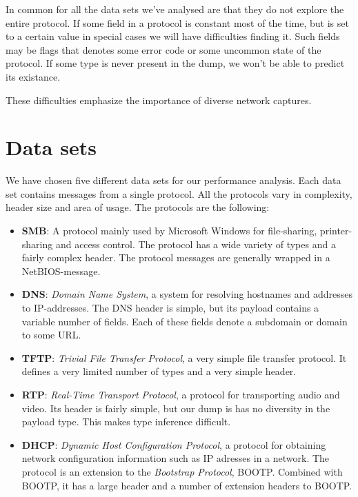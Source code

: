 \documentclass[a4paper]{report}
\begin{document}
In common for all the data sets we've analysed are that they do not explore
the entire protocol. If some field in a protocol is constant most of the time,
but is set to a certain value in special cases we will have difficulties
finding it. Such fields may be flags that denotes some error code or some
uncommon state of the protocol. If some type is never present in the dump,
we won't be able to predict its existance.

These difficulties emphasize the importance of diverse network captures.

\section{Data sets}
We have chosen five different data sets for our performance analysis. Each
data set contains messages from a single protocol. All the protocols vary
in complexity, header size and area of usage. The protocols are the following:

\begin{itemize}
    \item \textbf{SMB}: A protocol mainly used by Microsoft Windows for 
        file-sharing, printer-sharing and access control. The protocol
        has a wide variety of types and a fairly complex header. The protocol
        messages are generally wrapped in a NetBIOS-message.
    \item \textbf{DNS}: \emph{Domain Name System}, a system for resolving
        hostnames and addresses to IP-addresses. The DNS header is simple,
        but its payload contains a variable number of fields. Each of these
        fields denote a subdomain or domain to some URL.
    \item \textbf{TFTP}: \emph{Trivial File Transfer Protocol}, a very simple
        file transfer protocol. It defines a very limited number of types
        and a very simple header.
    \item \textbf{RTP}: \emph{Real-Time Transport Protocol}, a protocol for
        transporting audio and video. Its header is fairly simple, but our
        dump is has no diversity in the payload type. This makes type
        inference difficult.
    \item \textbf{DHCP}: \emph{Dynamic Host Configuration Protocol}, a
        protocol for obtaining network configuration information such as
        IP adresses in a network. The protocol is an extension to the
        \emph{Bootstrap Protocol}, BOOTP. Combined with BOOTP, it has a large
        header and a number of extension headers to BOOTP.
\end{itemize}
\end{document}
